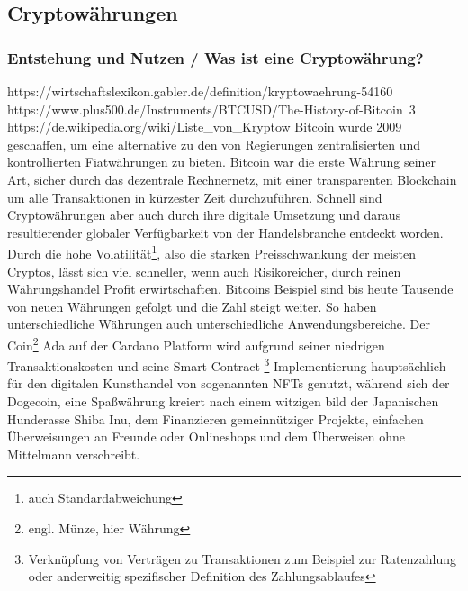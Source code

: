 \documentclass[12pt]{article}
\begin{document}
\subsection{Cryptowährungen}
	\subsubsection{Entstehung und Nutzen / Was ist eine Cryptowährung?}
		https://wirtschaftslexikon.gabler.de/definition/kryptowaehrung-54160 \\
		https://www.plus500.de/Instruments/BTCUSD/The-History-of-Bitcoin~3 \\
		https://de.wikipedia.org/wiki/Liste\_von\_Kryptow%
		Bitcoin wurde 2009 geschaffen, um eine alternative zu den von Regierungen zentralisierten und kontrollierten Fiatwährungen zu bieten. Bitcoin war die erste Währung seiner Art, sicher durch das dezentrale Rechnernetz, mit einer transparenten Blockchain um alle Transaktionen in kürzester Zeit durchzuführen. Schnell sind Cryptowährungen aber auch durch ihre digitale Umsetzung und daraus resultierender globaler Verfügbarkeit von der Handelsbranche entdeckt worden. Durch die hohe Volatilität\footnote{auch Standardabweichung}, also die starken Preisschwankung der meisten Cryptos, lässt sich viel schneller, wenn auch Risikoreicher, durch reinen Währungshandel Profit erwirtschaften. Bitcoins Beispiel sind bis heute Tausende von neuen Währungen gefolgt und die Zahl steigt weiter. So haben unterschiedliche Währungen auch unterschiedliche Anwendungsbereiche. Der Coin\footnote{engl. Münze, hier Währung} Ada auf der Cardano Platform wird aufgrund seiner niedrigen Transaktionskosten und seine Smart Contract \footnote{Verknüpfung von Verträgen zu Transaktionen zum Beispiel zur Ratenzahlung oder anderweitig spezifischer Definition des Zahlungsablaufes} Implementierung hauptsächlich für den digitalen Kunsthandel von sogenannten NFTs genutzt, während sich der Dogecoin, eine Spaßwährung kreiert nach einem witzigen bild der Japanischen Hunderasse Shiba Inu, dem Finanzieren gemeinnütziger Projekte, einfachen Überweisungen an Freunde oder Onlineshops und dem Überweisen ohne Mittelmann verschreibt.
		
\end{document}
